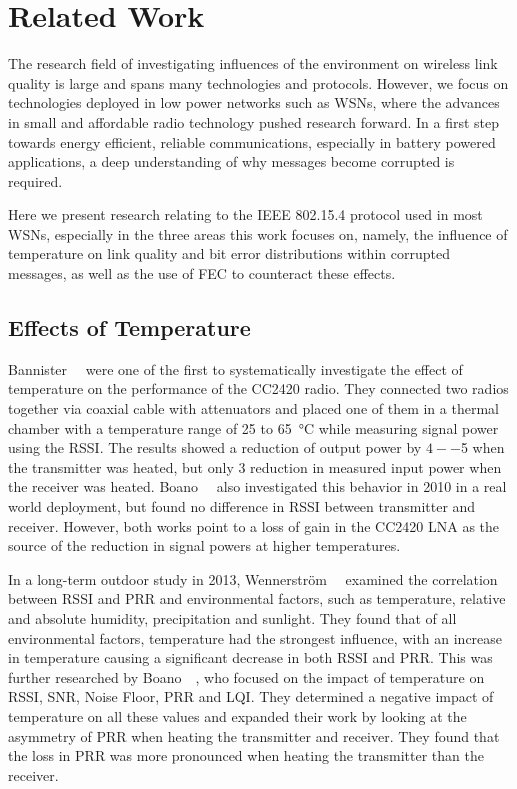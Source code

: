 \chapter{Related Work}
\label{chap:related_work}

The research field of investigating influences of the environment on wireless link quality is large and spans many technologies and protocols.
However, we focus on technologies deployed in low power networks such as \ac{WSN}s, where the advances in small and affordable radio technology pushed research forward.
In a first step towards energy efficient, reliable communications, especially in battery powered applications, a deep understanding of why messages become corrupted is required.

Here we present research relating to the IEEE 802.15.4 protocol used in most \ac{WSN}s, especially in the three areas this work focuses on, namely, the influence of temperature on link quality and bit error distributions within corrupted messages, as well as the use of \ac{FEC} to counteract these effects.


\section{Effects of Temperature}

Bannister~\etal~\cite{Bannister2008} were one of the first to systematically investigate the effect of temperature on the performance of the CC2420 radio.
They connected two radios together via coaxial cable with attenuators and placed one of them in a thermal chamber with a temperature range of 25 to \SI{65}{\celsius} while measuring signal power using the \ac{RSSI}.
The results showed a reduction of output power by $4--$\SI{5}{\dBm} when the transmitter was heated, but only \SI{3}{\dBm} reduction in measured input power when the receiver was heated.
Boano~\etal~\cite{Boano2010} also investigated this behavior in 2010 in a real world deployment, but found no difference in \ac{RSSI} between transmitter and receiver.
However, both works point to a loss of gain in the CC2420 \ac{LNA} as the source of the reduction in signal powers at higher temperatures.

In a long-term outdoor study in 2013, Wennerstr{\"o}m~\etal~\cite{Wennerstrom2013} examined the correlation between \ac{RSSI} and \ac{PRR} and environmental factors, such as temperature, relative and absolute humidity, precipitation and sunlight.
They found that of all environmental factors, temperature had the strongest influence, with an increase in temperature causing a significant decrease in both \ac{RSSI} and \ac{PRR}.
This was further researched by Boano~\etal~\cite{Boano2013}, who focused on the impact of temperature on \ac{RSSI}, \ac{SNR}, Noise Floor, \ac{PRR} and \ac{LQI}.
They determined a negative impact of temperature on all these values and expanded their work by looking at the asymmetry of \ac{PRR} when heating the transmitter and receiver.
They found that the loss in \ac{PRR} was more pronounced when heating the transmitter than the receiver.

